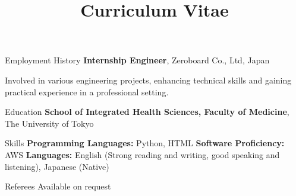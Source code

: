 \documentclass[a4paper,skipsamekey,11pt,english]{curve}
\begin{document}
\makeheaders[c]


\rightheader{~}
\begin{fullonly}
\end{fullonly}

\title{Curriculum Vitae}

\begin{rubric}{Employment History}
%
  \textbf{Internship Engineer}, Zeroboard Co., Ltd, Japan
  \par Involved in various engineering projects, enhancing technical skills and gaining practical experience in a professional setting.
\end{rubric}

\begin{rubric}{Education}
\entry*[2021 -- Present]%
  \textbf{School of Integrated Health Sciences, Faculty of Medicine}, The University of Tokyo
\end{rubric}

\begin{rubric}{Skills}
\entry*
  \textbf{Programming Languages:} Python, HTML
\entry*
  \textbf{Software Proficiency:} AWS
\entry*
  \textbf{Languages:} English (Strong reading and writing, good speaking and listening), Japanese (Native)
\end{rubric}

\begin{rubric}{Referees}
\entry* Available on request
\end{rubric}
\end{document}
